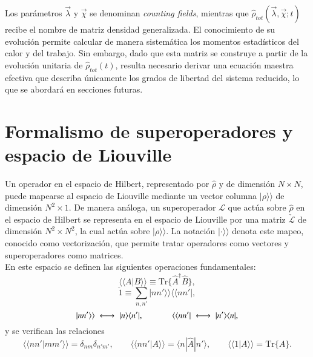 Los parámetros $\vec{\lambda}$ y $\vec{\chi}$ se denominan \textit{counting fields}\cite{esposito2009nonequilibrium,landi2024current}, mientras que $\hat{\rho}_{tot}(\vec{\lambda},\vec{\chi};t)$ recibe el nombre de matriz densidad generalizada. El conocimiento de su evolución permite calcular de manera sistemática los momentos estadísticos del calor y del trabajo. Sin embargo, dado que esta matriz se construye a partir de la evolución unitaria de $\hat{\rho}_{tot}(t)$, resulta necesario derivar una ecuación maestra efectiva que describa únicamente los grados de libertad del sistema reducido, lo que se abordará en secciones futuras.


\label{sec2:estadistica2puntos}

\section{Formalismo de superoperadores y espacio de Liouville} 

Un operador en el espacio de Hilbert, representado por $\hat{\rho}$ y de dimensión $N\times N$, puede mapearse al espacio de Liouville mediante un vector columna $|\rho \rangle \rangle$ de dimensión $N^{2}\times 1$. De manera análoga, un superoperador $\mathcal{L}$ que actúa sobre $\hat{\rho}$ en el espacio de Hilbert se representa en el espacio de Liouville por una matriz $\check{\mathcal{L}}$ de dimensión $N^2 \times N^2$, la cual actúa sobre $|\rho\rangle\rangle$. La notación $|\cdot\rangle\rangle$ denota este mapeo, conocido como vectorización, que permite tratar operadores como vectores y superoperadores como matrices.
\\

En este espacio se definen las siguientes operaciones fundamentales:
\begin{equation*}
    \langle \langle A|B\rangle \rangle  \equiv \text{Tr}\{\hat{A}^{\dagger}\hat{B}\},
\end{equation*}
\begin{equation*}
    \check{1}  \equiv \sum_{n,n'}|nn'\rangle \rangle \langle \langle nn'|,
\end{equation*}
\begin{equation*}
     |nn'\rangle \rangle \;\longleftrightarrow\; |n\rangle \langle n'|,
     \hspace{12mm}  
     \langle \langle nn'| \;\longleftrightarrow\; |n'\rangle \langle n|,
\end{equation*}
y se verifican las relaciones
\begin{equation*}
     \langle \langle nn'|mm'\rangle \rangle  = \delta_{nm}\delta_{n'm'},
     \qquad
     \langle \langle nn'|A\rangle \rangle  = \langle n|\hat{A}|n'\rangle,
     \qquad
     \langle \langle 1|A\rangle \rangle  = \text{Tr}\{\hat{A}\}.
\end{equation*}

